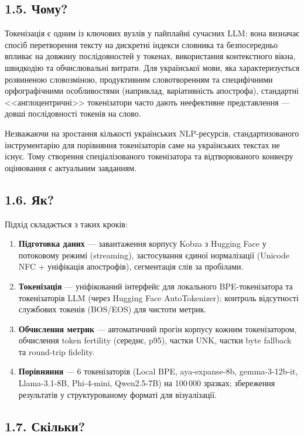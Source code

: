 \documentclass[14pt]{extarticle}
\begin{document}
\subsection*{1.5. Чому?}

Токенізація є одним із ключових вузлів у пайплайні сучасних LLM: вона визначає спосіб перетворення тексту на дискретні індекси словника та безпосередньо впливає на довжину послідовностей у токенах, використання контекстного вікна, швидкодію та обчислювальні витрати. Для української мови, яка характеризується розвиненою словозміною, продуктивним словотворенням та специфічними орфографічними особливостями (наприклад, варіативність апострофа), стандартні <<англоцентричні>> токенізатори часто дають неефективне представлення --- довші послідовності токенів на слово.

Незважаючи на зростання кількості українських NLP-ресурсів, стандартизованого інструментарію для порівняння токенізаторів саме на українських текстах не існує. Тому створення спеціалізованого токенізатора та відтворюваного конвеєру оцінювання є актуальним завданням.

\subsection*{1.6. Як?}

Підхід складається з таких кроків:
\begin{enumerate}
  \item \textbf{Підготовка даних} --- завантаження корпусу Kobza з Hugging Face у потоковому режимі (streaming), застосування єдиної нормалізації (Unicode NFC + уніфікація апострофів), сегментація слів за пробілами.
  \item \textbf{Токенізація} --- уніфікований інтерфейс для локального BPE-токенізатора та токенізаторів LLM (через Hugging Face AutoTokenizer); контроль відсутності службових токенів (BOS/EOS) для чистоти метрик.
  \item \textbf{Обчислення метрик} --- автоматичний прогін корпусу кожним токенізатором, обчислення token fertility (середнє, p95), частки UNK, частки byte fallback та round-trip fidelity.
  \item \textbf{Порівняння} --- 6 токенізаторів (Local BPE, aya-expanse-8b, gemma-3-12b-it, Llama-3.1-8B, Phi-4-mini, Qwen2.5-7B) на 100\,000 зразках; збереження результатів у структурованому форматі для візуалізації.
\end{enumerate}

\subsection*{1.7. Скільки?}
\end{document}
